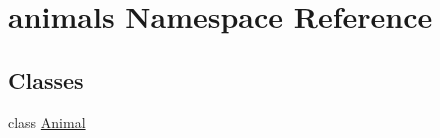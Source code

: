 \hypertarget{namespaceanimals}{}\section{animals Namespace Reference}
\label{namespaceanimals}
\subsection*{Classes}
\begin{DoxyCompactItemize}
\item 
class \hyperlink{classanimals_1_1_animal}{Animal}
\end{DoxyCompactItemize}
